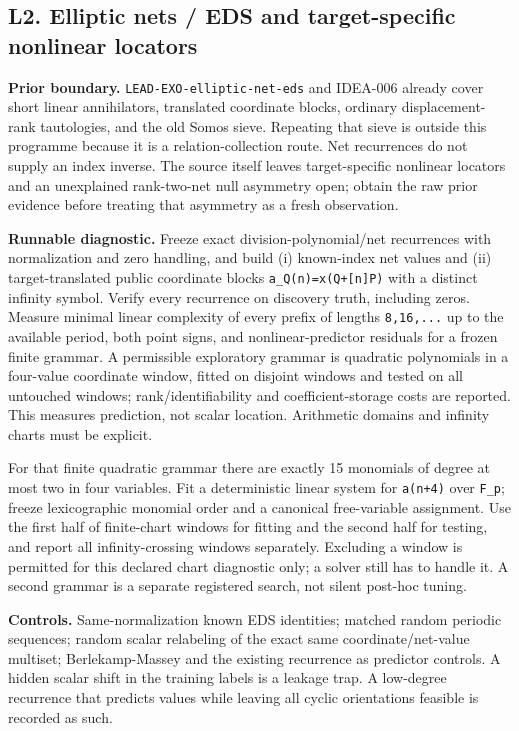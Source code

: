 \documentclass[
  10pt,
]{article}
\begin{document}
\subsection{L2. Elliptic nets / EDS and target-specific nonlinear
locators}\label{l2.-elliptic-nets-eds-and-target-specific-nonlinear-locators}

\textbf{Prior boundary.} \texttt{LEAD-EXO-elliptic-net-eds} and IDEA-006
already cover short linear annihilators, translated coordinate blocks,
ordinary displacement-rank tautologies, and the old Somos sieve.
Repeating that sieve is outside this programme because it is a
relation-collection route. Net recurrences do not supply an index
inverse. The source itself leaves target-specific nonlinear locators and
an unexplained rank-two-net null asymmetry open; obtain the raw prior
evidence before treating that asymmetry as a fresh observation.

\textbf{Runnable diagnostic.} Freeze exact division-polynomial/net
recurrences with normalization and zero handling, and build (i)
known-index net values and (ii) target-translated public coordinate
blocks \texttt{a\_Q(n)=x(Q+{[}n{]}P)} with a distinct infinity symbol.
Verify every recurrence on discovery truth, including zeros. Measure
minimal linear complexity of every prefix of lengths \texttt{8,16,...}
up to the available period, both point signs, and nonlinear-predictor
residuals for a frozen finite grammar. A permissible exploratory grammar
is quadratic polynomials in a four-value coordinate window, fitted on
disjoint windows and tested on all untouched windows;
rank/identifiability and coefficient-storage costs are reported. This
measures prediction, not scalar location. Arithmetic domains and
infinity charts must be explicit.

For that finite quadratic grammar there are exactly 15 monomials of
degree at most two in four variables. Fit a deterministic linear system
for \texttt{a(n+4)} over \texttt{F\_p}; freeze lexicographic monomial
order and a canonical free-variable assignment. Use the first half of
finite-chart windows for fitting and the second half for testing, and
report all infinity-crossing windows separately. Excluding a window is
permitted for this declared chart diagnostic only; a solver still has to
handle it. A second grammar is a separate registered search, not silent
post-hoc tuning.

\textbf{Controls.} Same-normalization known EDS identities; matched
random periodic sequences; random scalar relabeling of the exact same
coordinate/net-value multiset; Berlekamp-Massey and the existing
recurrence as predictor controls. A hidden scalar shift in the training
labels is a leakage trap. A low-degree recurrence that predicts values
while leaving all cyclic orientations feasible is recorded as such.
\end{document}
